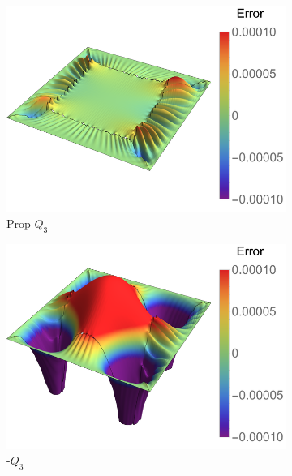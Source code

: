 \begin{figure}
	\center
	\captionsetup[subfigure]{labelformat=empty}
	\begin{subfigure}[t]{.45\linewidth}
		\center
		\includegraphics[scale=.52]{five_patch_biharmonic_op_contour}
		\caption{Prop-$Q_3$}
	\end{subfigure}
	\begin{subfigure}[t]{.45\linewidth}
		\center
		\includegraphics[scale=.52]{five_patch_biharmonic_Bezier_contour}
		\caption{\Bezier-$Q_3$}
	\end{subfigure}\\
	\center
	\begin{subfigure}[t]{.45\linewidth}
		\center

\end{subfigure}
\end{figure}
